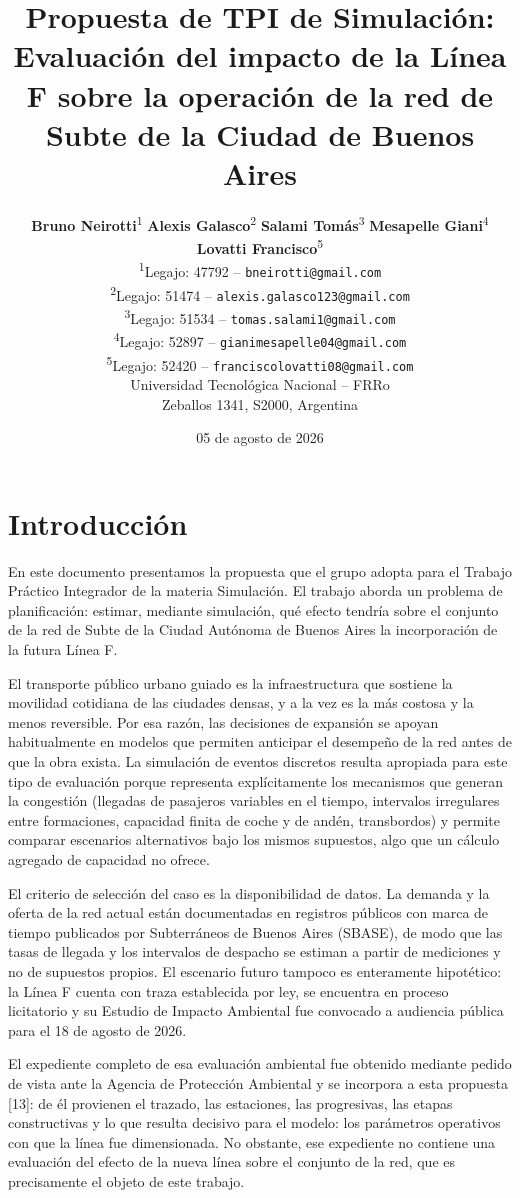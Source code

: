 \documentclass{article}
\title{Propuesta de TPI de Simulación: Evaluación del impacto de la Línea F sobre la operación de la red de Subte de la Ciudad de Buenos Aires}
\author{
  \textbf{Bruno Neirotti}\textsuperscript{1} \qquad \textbf{Alexis Galasco}\textsuperscript{2} \qquad \textbf{Salami Tomás}\textsuperscript{3} \qquad \textbf{Mesapelle Giani}\textsuperscript{4} \qquad \textbf{Lovatti Francisco}\textsuperscript{5} \\[0.5ex]
  \textsuperscript{1}Legajo: 47792 -- \texttt{bneirotti@gmail.com} \\
  \textsuperscript{2}Legajo: 51474 -- \texttt{alexis.galasco123@gmail.com} \\
  \textsuperscript{3}Legajo: 51534 -- \texttt{tomas.salami1@gmail.com} \\
  \textsuperscript{4}Legajo: 52897 -- \texttt{gianimesapelle04@gmail.com} \\
  \textsuperscript{5}Legajo: 52420 -- \texttt{franciscolovatti08@gmail.com} \\[0.5ex]
  Universidad Tecnológica Nacional -- FRRo \\
  Zeballos 1341, S2000, Argentina \\
}
\date{05 de agosto de 2026}
\begin{document}
\maketitle

\section{Introducción}

En este documento presentamos la propuesta que el grupo adopta para el Trabajo Práctico Integrador de la
materia Simulación. El trabajo aborda un problema de planificación: estimar, mediante simulación, qué
efecto tendría sobre el conjunto de la red de Subte de la Ciudad Autónoma de Buenos Aires la incorporación
de la futura Línea F.

El transporte público urbano guiado es la infraestructura que sostiene la movilidad cotidiana de las
ciudades densas, y a la vez es la más costosa y la menos reversible. Por esa razón, las decisiones de expansión
se apoyan habitualmente en modelos que permiten anticipar el desempeño de la red antes de que la obra
exista. La simulación de eventos discretos resulta apropiada para este tipo de evaluación porque
representa explícitamente los mecanismos que generan la congestión (llegadas de pasajeros variables en
el tiempo, intervalos irregulares entre formaciones, capacidad finita de coche y de andén, transbordos)
y permite comparar escenarios alternativos bajo los mismos supuestos, algo que un cálculo agregado de
capacidad no ofrece.

El criterio de selección del caso es la disponibilidad de datos. La demanda y la oferta de la red actual
están documentadas en registros públicos con marca de tiempo publicados por Subterráneos de Buenos Aires
(SBASE), de modo que las tasas de llegada y los intervalos de despacho se estiman a partir de mediciones y
no de supuestos propios. El escenario futuro tampoco es enteramente hipotético: la Línea F cuenta con traza
establecida por ley, se encuentra en proceso licitatorio y su Estudio de Impacto Ambiental fue convocado a
audiencia pública para el 18 de agosto de 2026.

El expediente completo de esa evaluación ambiental fue obtenido
mediante pedido de vista ante la Agencia de Protección Ambiental y se incorpora a esta propuesta [13]: de él
provienen el trazado, las estaciones, las progresivas, las etapas constructivas y lo que resulta
decisivo para el modelo: los parámetros operativos con que la línea fue dimensionada. No obstante, ese
expediente no contiene una evaluación del efecto de la nueva línea sobre el conjunto de la red, que es
precisamente el objeto de este trabajo.
\end{document}
